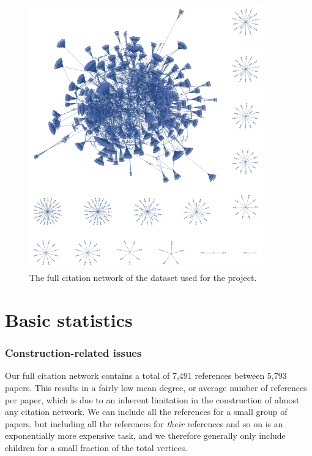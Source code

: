 \documentclass[12pt]{thesis}
\theoremstyle{plain}
\theoremstyle{definition}
\theoremstyle{remark}
\begin{document}
\begin{figure}[p]
\centering
\includegraphics[width=0.9\textwidth]{full_citation_network.png}
\caption{The full citation network of the dataset used for the project.}
\label{fig:full_database}
\end{figure}

\section{Basic statistics}

\subsubsection{Construction-related issues}

Our full citation network contains a total of 7,491 references between 5,793 papers. This results in a fairly low mean degree, or average number of references per paper, which is due to an inherent limitation in the construction of almost any citation network. We can include all the references for a small group of papers, but including all the references for \textit{their} references and so on is an exponentially more expensive task, and we therefore generally only include children for a small fraction of the total vertices. 
\end{document}
